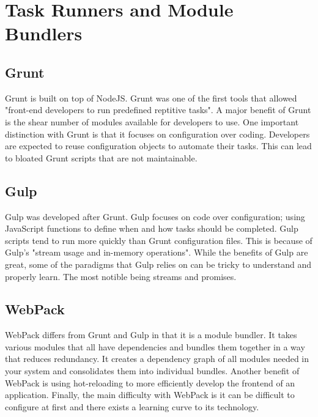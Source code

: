 \documentclass[draftclsnofoot,onecolumn,letterpaper,10pt,compsoc]{IEEEtran}
\begin{document}
\section{Task Runners and Module Bundlers}
	\subsection{Grunt}
        Grunt is built on top of NodeJS. 
        Grunt was one of the first tools that allowed "front-end developers to run predefined reptitive tasks"\cite{TaskRunners}. 
        A major benefit of Grunt is the shear number of modules available for developers to use. 
        One important distinction with Grunt is that it focuses on configuration over coding. 
        Developers are expected to reuse configuration objects to automate their tasks. 
        This can lead to bloated Grunt scripts that are not maintainable\cite{TaskRunners}.
    
	\subsection{Gulp}
        Gulp was developed after Grunt. Gulp focuses on code over configuration\cite{TaskRunners}; using JavaScript functions to define when and how tasks should be completed. 
        Gulp scripts tend to run more quickly than Grunt configuration files\cite{GulpGruntSpeed}. 
        This is because of Gulp's "stream usage and in-memory operations"\cite{TaskRunners}. 
        While the benefits of Gulp are great, some of the paradigms that Gulp relies on can be tricky to understand and properly learn. 
        The most notible being streams and promises\cite{TaskRunners}.
    
	\subsection{WebPack}
        WebPack differs from Grunt and Gulp in that it is a module bundler. 
        It takes various modules that all have dependencies and bundles them together in a way that reduces redundancy\cite{WebPack}. 
        It creates a dependency graph of all modules needed in your system and consolidates them into individual bundles\cite{WebPack}.
        Another benefit of WebPack is using hot-reloading to more efficiently develop the frontend of an application\cite{TaskRunners}.
        Finally, the main difficulty with WebPack is it can be difficult to configure at first and there exists a learning curve to its technology\cite{TaskRunners}.

{}

\end{document}
